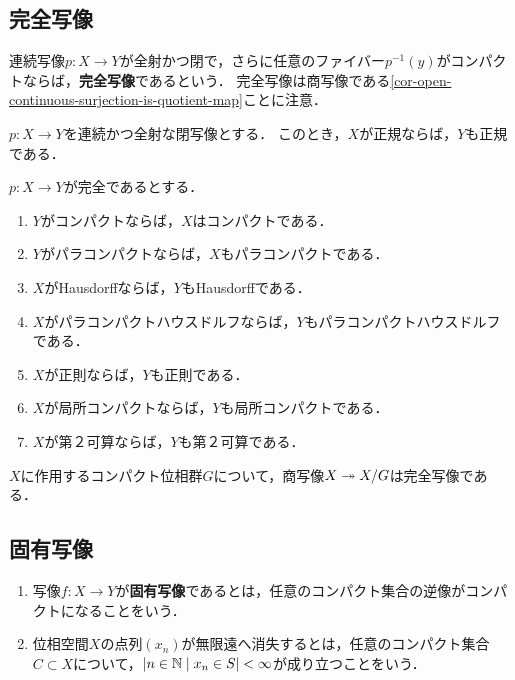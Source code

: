 \documentclass[uplatex,dvipdfmx]{jsreport}
\begin{document}
\subsection{完全写像}

\begin{definition}
    連続写像$p:X\to Y$が全射かつ閉で，さらに任意のファイバー$p^{-1}(y)$がコンパクトならば，\textbf{完全写像}であるという．
    完全写像は商写像である\ref{cor-open-continuous-surjection-is-quotient-map}ことに注意．
\end{definition}

\begin{proposition}
    $p:X\to Y$を連続かつ全射な閉写像とする．
    このとき，$X$が正規ならば，$Y$も正規である．
\end{proposition}

\begin{proposition}
    $p:X\to Y$が完全であるとする．
    \begin{enumerate}
        \item $Y$がコンパクトならば，$X$はコンパクトである．
        \item $Y$がパラコンパクトならば，$X$もパラコンパクトである．
        \item $X$がHausdorffならば，$Y$もHausdorffである．
        \item $X$がパラコンパクトハウスドルフならば，$Y$もパラコンパクトハウスドルフである．
        \item $X$が正則ならば，$Y$も正則である．
        \item $X$が局所コンパクトならば，$Y$も局所コンパクトである．
        \item $X$が第２可算ならば，$Y$も第２可算である．
    \end{enumerate}
\end{proposition}

\begin{example}
    $X$に作用するコンパクト位相群$G$について，商写像$X\twoheadrightarrow X/G$は完全写像である．
\end{example}

\subsection{固有写像}

\begin{definition}\mbox{}
    \begin{enumerate}
        \item 写像$f:X\to Y$が\textbf{固有写像}であるとは，任意のコンパクト集合の逆像がコンパクトになることをいう．
        \item 位相空間$X$の点列$(x_n)$が無限遠へ消失するとは，任意のコンパクト集合$C\subset X$について，$\lvert n\in\mathbb{N}\mid x_n\in S\rvert<\infty$が成り立つことをいう．
    \end{enumerate}
\end{definition}
\end{document}
